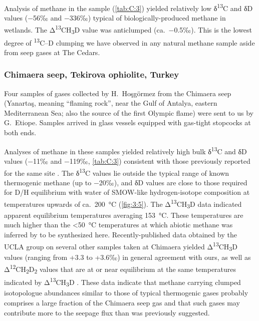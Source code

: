 Analysis of methane in the sample (\autoref{tab:C:3}) yielded relatively low δ\textsuperscript{13}C and δD values ($-$56‰ and $-$336‰) typical of biologically-produced methane in wetlands.  The Δ\textsuperscript{13}CH\textsubscript{3}D value was anticlumped (ca.\ $-$0.5‰).  This is the lowest degree of \textsuperscript{13}C--D clumping we have observed in any natural methane sample aside from seep gases at The Cedars.  

\subsubsection{Chimaera seep, Tekirova ophiolite, Turkey}
Four samples of gases collected by H.\ Hoşgörmez from the Chimaera seep (Yanartaş, meaning ``flaming rock'', near the Gulf of Antalya, eastern Mediterranean Sea; also the source of the first Olympic flame)   were sent to us by G.\ Etiope.  Samples arrived in glass vessels equipped with gas-tight stopcocks at both ends.  

Analyses of methane in these samples yielded relatively high bulk δ\textsuperscript{13}C and δD values ($-$11‰ and $-$119‰, \autoref{tab:C:3}) consistent with those previously reported for the same site \parencite{Etiope++_2011_EPSL,Hosgormez++_2008_Gf,Hosgormez_2007_JAsES}.  The δ\textsuperscript{13}C values lie outside the typical range of known thermogenic methane (up to $-$20‰), and δD values are close to those required for D/H equilibrium with water of SMOW-like hydrogen-isotope composition at temperatures upwards of ca.\ 200~°C (\autoref{fig:3:5}).  The Δ\textsuperscript{13}CH\textsubscript{3}D data indicated apparent equilibrium temperatures averaging 153~°C.  These temperatures are much higher than the \textless50~°C temperatures at which abiotic methane was inferred by \textcite{Etiope++_2011_EPSL} to be synthesized here.  Recently-published data obtained by the UCLA group on several other samples taken at Chimaera yielded Δ\textsuperscript{13}CH\textsubscript{3}D values (ranging from +3.3 to +3.6‰) in general agreement with ours, as well as Δ\textsuperscript{12}CH\textsubscript{2}D\textsubscript{2} values that are at or near equilibrium at the same temperatures indicated by Δ\textsuperscript{13}CH\textsubscript{3}D \parencite{Young++_2017_GCA}.  These data indicate that methane carrying clumped isotopologue abundances similar to those of typical thermogenic gases probably comprises a large fraction of the Chimaera seep gas and that such gases may contribute more to the seepage flux than was previously suggested.  



